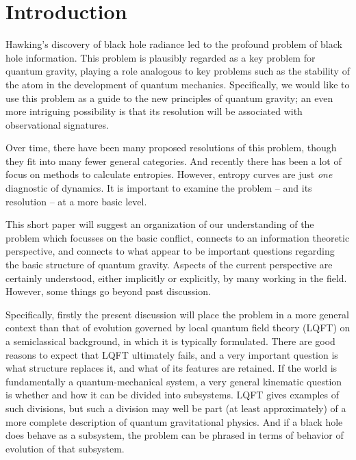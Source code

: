 \documentclass[12pt]{article}
\numberwithin{equation}{section}
\begin{document}
\tableofcontents

\newpage

\section{Introduction}

Hawking's discovery\cite{Hawk} of black hole radiance led to the profound problem of black hole information.  This problem is plausibly  regarded as a key problem for quantum gravity, playing a role analogous to key problems such as the stability of the atom in the development of quantum mechanics.  Specifically, we would like to use this problem as a guide to the new principles of quantum gravity; an even more intriguing possibility is that its resolution will be associated with observational signatures.

Over time, there have been many proposed resolutions of this problem, though they fit into many fewer general categories.  And recently there has been a lot of focus on methods to calculate entropies\cite{AEMM,AMMZ,PSSY,AHMST,AHMSTrev}.  However, entropy curves are just {\it one} diagnostic of dynamics.  It is important to examine the problem -- and its resolution -- at a more basic level.

This short paper will suggest an organization of our understanding of the problem which focusses on the basic conflict,  connects to an information theoretic perspective, and connects to  what appear to be important questions regarding the basic structure of quantum gravity.  Aspects of the current perspective are certainly understood, either implicitly or explicitly, by many working in the field.  However, some things go beyond past discussion.

Specifically, firstly the present discussion will  place the problem in a more general context than that of evolution governed by local quantum field theory (LQFT) on a semiclassical background, in which it is typically formulated.  There are good reasons to expect that LQFT ultimately fails, and a very important question is what structure replaces it, and what of its features are retained.  If the world is fundamentally a quantum-mechanical system, a very general kinematic question is whether and how it can be divided into subsystems.  LQFT gives examples of such divisions, but such a division may well be part  (at least approximately) of a more complete description of quantum gravitational physics.  And if a black hole does behave as a subsystem, the problem can be phrased in terms of behavior of evolution of that subsystem.
\end{document}

